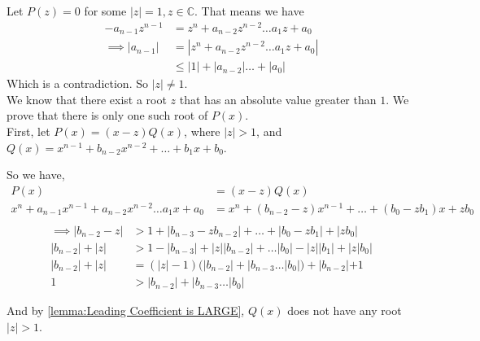 
\begin{prooof}
    Let $ P(z) = 0 $ for some $ |z|=1, z\in\mathbb{C} $. That means we have 
    \begin{align*}
        -a_{n-1}z^{n-1} &=  z^n + a_{n-2}z^{n-2} \dots a_1z + a_0 \\
        \implies |a_{n-1}| &= |z^n + a_{n-2}z^{n-2} \dots a_1z + a_0|\\
                           &\le |1| + |a_{n-2}| \dots + |a_0|
    \end{align*}
    Which is a contradiction. So $ |z|\ne 1 $.\\

    We know that there exist a root $ z $ that has an absolute value greater than $ 1 $. We prove that there is only one such root of $ P(x) $. \\

    First, let $ P(x)=(x-z)Q(x) $, where $ |z|>1 $, and $ Q(x) = x^{n-1} + b_{n-2}x^{n-2} + \dots + b_1x + b_0 $.

    So we have, 
    \begin{align*}
        P(x) &= (x-z)Q(x)\\
        x^n + a_{n-1}x^{n-1} + a_{n-2}x^{n-2} \dots a_1x + a_0 &= x^n + (b_{n-2} - z)x^{n-1} + \dots + (b_0-zb_1)x+ zb_0\\
    \end{align*}%
    \begin{align*}
        \implies |b_{n-2} - z| &> 1 + |b_{n-3} - zb_{n-2}| + \dots + |b_0 - zb_1| + |zb_0|\\[.5em]
        |b_{n-2}| + |z| & > 1 - |b_{n-3}| + |z||b_{n-2}| + \dots |b_0| - |z||b_1| + |z|b_0|\\[.5em]
        |b_{n-2}| + |z| &= (|z|-1)(|b_{n-2}| + |b_{n-3} \dots |b_0|) + |b_{n-2}| + 1\\[.5em]
        1 &> |b_{n-2}| + |b_{n-3} \dots |b_0|
    \end{align*}

    And by \autoref{lemma:Leading Coefficient is LARGE}, $ Q(x) $ does not have any root $ |z|>1 $. 
    \end{prooof}






